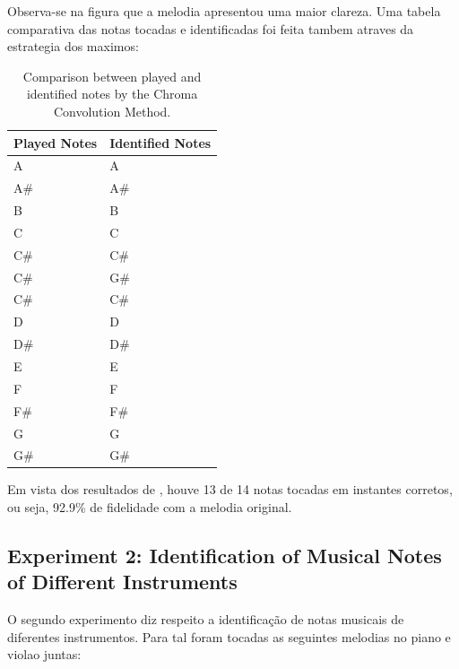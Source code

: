\documentclass{article}
\begin{document}
	Observa-se na figura  que a melodia apresentou uma maior clareza. Uma tabela comparativa das notas tocadas e identificadas foi feita tambem atraves da estrategia dos maximos:

	\begin{table}[h]
	 \begin{center}
	 \begin{tabular}{|l|l|}
	  \hline
	  Played Notes & Identified Notes \\
	  \hline
	  A  & A \\
	  A\#  & A\# \\
	  B  & B \\
	  C  & C \\
	  C\#  & C\# \\
	  C\#  & G\# \\
	  C\#  & C\# \\
	  D  & D \\
	  D\#  & D\# \\
	  E  & E \\
	  F  & F \\
	  F\#  & F\# \\
	  G  & G \\
	  G\#  & G\# \\
	  \hline
	 \end{tabular}
	\end{center}
	 \caption{Comparison between played and identified notes by the Chroma Convolution Method.}
	 \label{tab:table-1-ccm}
	\end{table}

	Em vista dos resultados de , houve 13 de 14 notas tocadas em instantes corretos, ou seja, 92.9\% de fidelidade com a melodia original.


	\subsection{Experiment 2: Identification of Musical Notes of Different Instruments}

	O segundo experimento diz respeito a identificação de notas musicais de diferentes instrumentos. Para tal foram tocadas as seguintes melodias no piano e violao juntas:
\end{document}
